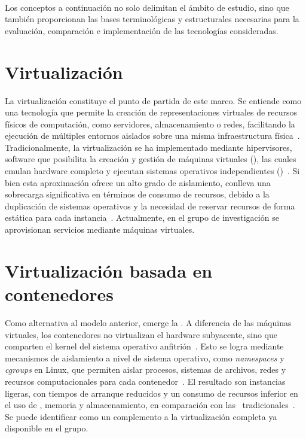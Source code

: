 \label{cap:marcoConceptual}
\mbox{}\\
Los conceptos a continuación no solo delimitan el ámbito de estudio, sino que también proporcionan las bases terminológicas y estructurales necesarias para la evaluación, comparación e implementación de las tecnologías consideradas. 

\section{Virtualización}
\noindent
La virtualización constituye el punto de partida de este marco. Se entiende como una tecnología que permite la creación de representaciones virtuales de recursos físicos de computación, como servidores, almacenamiento o redes, facilitando la ejecución de múltiples entornos aislados sobre una misma infraestructura física~\citep{AmazonWebServicesInc2023}. Tradicionalmente, la virtualización se ha implementado mediante hipervisores, software que posibilita la creación y gestión de máquinas virtuales (\VM), las cuales emulan hardware completo y ejecutan sistemas operativos independientes (\OS)~\citep{KLEIDERMACHER201225}. Si bien esta aproximación ofrece un alto grado de aislamiento, conlleva una sobrecarga significativa en términos de consumo de recursos, debido a la duplicación de sistemas operativos y la necesidad de reservar recursos de forma estática para cada instancia~\citep{bauman2015survey}. Actualmente, en el grupo de investigación se aprovisionan servicios mediante máquinas virtuales.

\section{Virtualización basada en contenedores}
\noindent
Como alternativa al modelo anterior, emerge la \VBC. A diferencia de las máquinas virtuales, los contenedores no virtualizan el hardware subyacente, sino que comparten el kernel del sistema operativo anfitrión~\citep{eder2016hypervisor}. Esto se logra mediante mecanismos de aislamiento a nivel de sistema operativo, como \textit{namespaces} y \textit{cgroups} en Linux, que permiten aislar procesos, sistemas de archivos, redes y recursos computacionales para cada contenedor~\citep{jain2020linux}. El resultado son instancias ligeras, con tiempos de arranque reducidos y un consumo de recursos inferior en el uso de \CPU\;, memoria y almacenamiento, en comparación con las \VM\ tradicionales~\citep{6903537}. Se puede identificar como un complemento a la virtualización completa ya disponible en el grupo.

